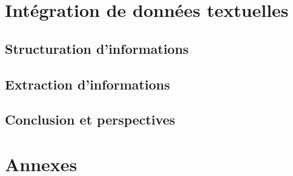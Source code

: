 \part{Intégration de données textuelles}
\glsresetall


\chapter{Structuration d'informations}
\minitoc


\chapter{Extraction d'informations}
\minitoc




\chapter{Conclusion et perspectives}


\cleardoublepage    %
\appendix
\part{Annexes}

\clearpage
\backmatter


\printglossary
{}
\printglossary[type=acronym]
